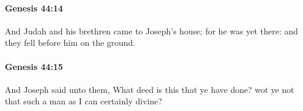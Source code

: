 		\paragraph{Genesis 44:14} %
			\label{GENESIS-44-14}

			And Judah and his brethren came to Joseph's house; for he was yet there: and they fell before him on the ground.


		\paragraph{Genesis 44:15} %
			\label{GENESIS-44-15}

			And Joseph said unto them, What deed is this that ye have done? wot ye not that such a man as I can certainly divine?


